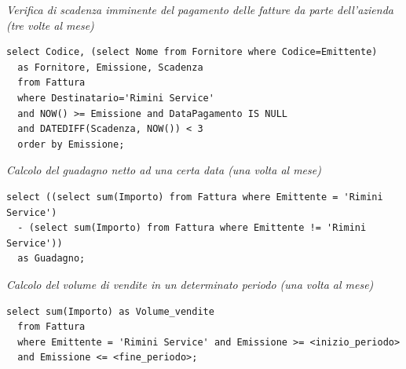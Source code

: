 \noindent{}
\newline\newline

\noindent\textit{Verifica di scadenza imminente del pagamento delle fatture da parte dell'azienda (tre volte al mese)}
\begin{verbatim}
select Codice, (select Nome from Fornitore where Codice=Emittente)
  as Fornitore, Emissione, Scadenza
  from Fattura
  where Destinatario='Rimini Service'
  and NOW() >= Emissione and DataPagamento IS NULL
  and DATEDIFF(Scadenza, NOW()) < 3
  order by Emissione;
\end{verbatim}
\vspace{0.5cm}

\noindent{}
\newline\newline

\noindent\textit{Calcolo del guadagno netto ad una certa data (una volta al mese)}
\begin{verbatim}
select ((select sum(Importo) from Fattura where Emittente = 'Rimini Service')
  - (select sum(Importo) from Fattura where Emittente != 'Rimini Service'))
  as Guadagno;
\end{verbatim}
\vspace{0.5cm}

\noindent{}
\newline\newline

\noindent\textit{Calcolo del volume di vendite in un determinato periodo (una volta al mese)}
\begin{verbatim}
select sum(Importo) as Volume_vendite
  from Fattura
  where Emittente = 'Rimini Service' and Emissione >= <inizio_periodo>
  and Emissione <= <fine_periodo>;
\end{verbatim}
\vspace{0.5cm}

